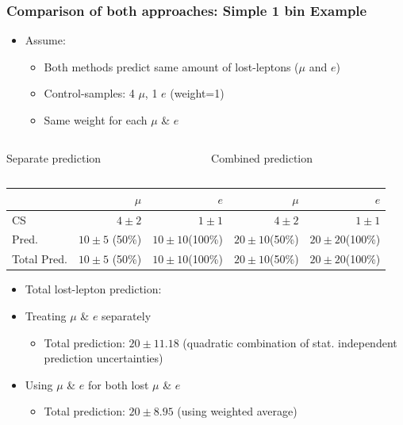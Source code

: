 \documentclass{beamer}
\begin{document}
\begin{frame}
  \frametitle{Comparison of both approaches: Simple 1 bin Example}
  \begin{itemize}
   \item Assume:
   \begin{itemize}
    \item Both methods predict same amount of lost-leptons ($\mu$ and $e$)
    \item Control-samples: 4 $\mu$, 1 $e$ (weight=1)
    \item Same weight for each $\mu$ \& $e$
   \end{itemize}

  \end{itemize}
  \begin{columns}
   \begin{column}{0.5\textwidth}
   \begin{center}
    Separate prediction
   \end{center}

   \end{column}
   \begin{column}{0.5\textwidth}
    \begin{center}
    Combined prediction
    \end{center}
   \end{column}

  \end{columns}

  \scriptsize
  \begin{tabular}{l|r|r||r|r}

                                                  &           $\mu$            &           $e$  &             $\mu$            &           $e$  \\
\midrule
     CS &                $4\pm2$ &             $1\pm1$ &              $4\pm2$ &             $1\pm1$  \\ \hline
      Pred.    &          $10\pm5$ (50\%) &              $10\pm10$(100\%)&              $20\pm10$(50\%)&                 $20\pm20$(100\%) \\
      Total Pred. &      $10\pm5$ (50\%) &              $10\pm10$(100\%)&              $20\pm10$(50\%)&                 $20\pm20$(100\%) \\
\bottomrule
\end{tabular}
\small
\begin{itemize}
 \item Total lost-lepton prediction:
 \item Treating $\mu$ \& $e$ separately
 \begin{itemize}
  \item Total prediction: $20\pm11.18$ (quadratic combination of stat. independent prediction uncertainties)
 \end{itemize}
 \item Using $\mu$ \& $e$ for both lost $\mu$ \& $e$
 \begin{itemize}
  \item Total prediction: $20\pm8.95$ (using weighted average)
 \end{itemize}
\end{itemize}
 \end{frame}


\setcounter{framenumber}{14}
\end{document}
